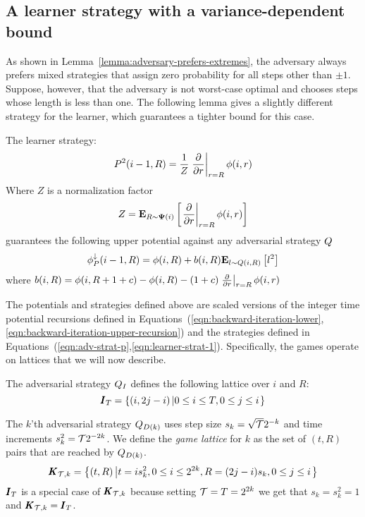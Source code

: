 \documentclass{article}[12pt]
\begin{document}
  \subsection{A learner strategy with a variance-dependent bound}

  As shown in Lemma~\ref{lemma:adversary-prefers-extremes}, the
  adversary always prefers mixed strategies that assign zero
  probability for all steps other than $\pm 1$. Suppose, however, that
  the adversary is not worst-case optimal and chooses steps whose
  length is less than one. The following lemma gives a slightly
  different strategy for the learner, which guarantees a tighter bound
  for this case.

  \begin{lemma} \label{lemma:second-order-bound}
      The learner strategy:
      \begin{equation} \label{eqn:learner-strat-2}
      P^2(i-1,R) =  \frac{1}{Z}
      \left. \frac{\partial}{\partial r} \right|_{r=R} \phi(i,r)
      \end{equation}
      Where $Z$ is a normalization factor
      $$Z = {\bf E}_{R \sim {\bf \Psi}(i)}\left[ \left. \frac{\partial}{\partial r} \right|_{r=R} \phi(i,r) \right]$$
      guarantees the following upper potential against any adversarial
      strategy $Q$
      \begin{equation} \label{eqn:value-iteration-upper}
        \phi_{P}^{\downarrow}(i-1, R) = \phi(i,R) + b(i,R) {\bf E}_{l \sim Q(i,R)}\left[ l^2 \right]
      \end{equation}
      where $b(i,R) = \phi(i,R+1+c) -\phi(i,R) - (1+c) \left. \frac{\partial}{\partial r} \right|_{r=R} \phi(i,r)$
   \end{lemma}


The potentials and strategies defined above are scaled versions of the
integer time potential recursions defined in
Equations~(\ref{eqn:backward-iteration-lower},\ref{eqn:backward-iteration-upper-recursion})
and the strategies defined in Equations~(\ref{eqn:adv-strat-p},\ref{eqn:learner-strat-1}). Specifically, the games operate on lattices that we will now describe.

The adversarial strategy $Q_I$ defines the following lattice over $i$ and $R$:
$$\pmb{I}_{T}=\left\{ (i,2j-i) \left| 0 \leq i \leq T, 0 \leq j \leq i\right. \right\}$$

The $k$'th adversarial strategy $Q_{D(k)}$ uses step size $s_k=\sqrt{\mathcal{T}} 2^{-k}$ and time
increments $s_k^2=\mathcal{T} 2^{-2k}$. We define the {\em game lattice}
for $k$ as the set of $(t,R)$ pairs that are reached by $Q_{D(k)}$.
\begin{equation}  \label{eqn:game-lattice}
  \pmb{K}_{{\mathcal{T},k}}=\left\{ (t,R) \left| t=i s_k^2, 0 \leq i \leq 2^{2k}, R=(2j-i)s_k, 0 \leq j \leq i\right. \right\}
  \end{equation}
$\pmb{I}_{T}$ is a special case of $\pmb{K}_{\mathcal{T},k}$ because setting
$\mathcal{T}=T=2^{2k}$ we get that $s_k=s_k^2=1$ and  $\pmb{K}_{\mathcal{T},k} = \pmb{I}_{T}$.
\end{document}
